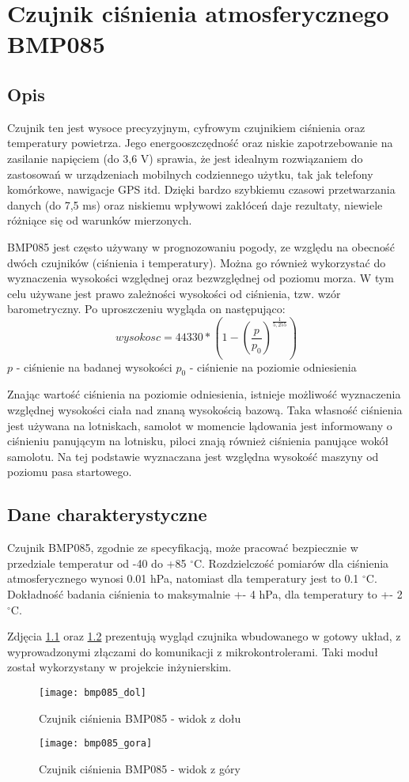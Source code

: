 \chapter{Czujnik ciśnienia atmosferycznego BMP085}
\section*{Opis}
Czujnik ten jest wysoce precyzyjnym, cyfrowym czujnikiem ciśnienia oraz temperatury powietrza. Jego energooszczędność oraz niskie zapotrzebowanie na zasilanie napięciem (do 3,6 V) sprawia, że jest idealnym rozwiązaniem do zastosowań w urządzeniach mobilnych codziennego użytku, tak jak telefony komórkowe, nawigacje GPS itd. Dzięki bardzo szybkiemu czasowi      przetwarzania danych (do 7,5 ms) oraz niskiemu wpływowi zakłóceń daje rezultaty, niewiele różniące się od warunków mierzonych.


BMP085 jest często używany w prognozowaniu pogody, ze względu na obecność dwóch czujników (ciśnienia i temperatury). Można go również wykorzystać do wyznaczenia wysokości względnej oraz bezwzględnej od poziomu morza. W tym celu używane jest prawo zależności wysokości od ciśnienia, tzw. wzór barometryczny. Po uproszczeniu wygląda on następująco:
$$ wysokosc = 44330 * (1- (\frac{p}{p_{0}})^{\frac{1}{5,255}}) $$
$ p $ - ciśnienie na badanej wysokości\newline
$ p_{0} $ - ciśnienie na poziomie odniesienia
\newline

Znając wartość ciśnienia na poziomie odniesienia, istnieje możliwość wyznaczenia względnej wysokości ciała nad znaną wysokością bazową. Taka własność ciśnienia jest używana na lotniskach, samolot w momencie lądowania jest informowany o ciśnieniu panującym na lotnisku, piloci znają również ciśnienia panujące wokół samolotu. Na tej podstawie wyznaczana jest względna wysokość maszyny od poziomu pasa startowego.

\section*{Dane charakterystyczne}
Czujnik BMP085, zgodnie ze specyfikacją, może pracować bezpiecznie w przedziale temperatur od -40 do +85 $^\circ$C. Rozdzielczość pomiarów dla ciśnienia atmosferycznego wynosi 0.01 hPa, natomiast dla temperatury jest to 0.1 $^\circ$C. Dokładność badania ciśnienia to maksymalnie +- 4 hPa, dla temperatury to +- 2$^\circ$C.

Zdjęcia \ref{fig:bmp085_dol} oraz \ref{fig:bmp085_gora} prezentują wygląd czujnika wbudowanego w gotowy układ, z wyprowadzonymi złączami do komunikacji z mikrokontrolerami. Taki moduł został wykorzystany w projekcie inżynierskim.
\begin{figure}[h]
\centering
\texttt{[image: bmp085\_dol]}
\caption{Czujnik ciśnienia BMP085 - widok z dołu}
\label{fig:bmp085_dol}
\end{figure}
\begin{figure}[h]
\centering
\texttt{[image: bmp085\_gora]}
\caption{Czujnik ciśnienia BMP085 - widok z góry}
\label{fig:bmp085_gora}
\end{figure}

